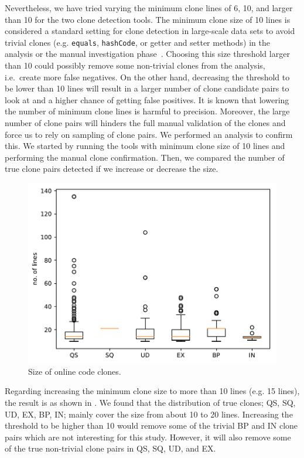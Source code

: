 \documentclass[10pt,journal,compsoc]{IEEEtran}
\begin{document}
Nevertheless, we have tried varying the minimum clone lines of 6, 10, and larger
than 10 for the two clone detection tools. The minimum clone size of 10 lines is
considered a standard setting for clone detection in large-scale data sets to
avoid trivial clones (e.g. \texttt{equals}, \texttt{hashCode}, or getter and
setter methods) in the analysis or the manual investigation
phase~\cite{Sajnani2016}. Choosing this size threshold larger than 10 could
possibly remove some non-trivial clones from the analysis, i.e.~create more
false negatives. On the other hand, decreasing the threshold to be lower than 10
lines will result in a larger number of clone candidate pairs to look at and a
higher chance of getting false positives. It is known that lowering the number
of minimum clone lines is harmful to precision. Moreover, the large number of
clone pairs will hinders the full manual validation of the clones and force us
to rely on sampling of clone pairs. We performed an analysis to confirm this. We
started by running the tools with minimum clone size of 10 lines and performing
the manual clone confirmation. Then, we compared the number of true clone pairs
detected if we increase or decrease the size.

\begin{figure}[H] \centering
	\includegraphics[width=0.8\linewidth]{boxplot_clone_size} 
	\caption{Size of online code clones.} 
	\label{fig:boxplotclonesize}
\end{figure}

Regarding increasing the minimum clone size to more than 10 lines (e.g. 15
lines), the result is as shown in
. We found that the distribution of true clones; QS,
SQ, UD, EX, BP, IN; mainly cover the size from about 10 to 20 lines. Increasing
the threshold to be higher than 10 would remove some of the trivial BP and IN
clone pairs which are not interesting for this study. However, it will also
remove some of the true non-trivial clone pairs in QS, SQ, UD, and EX.
\end{document}
